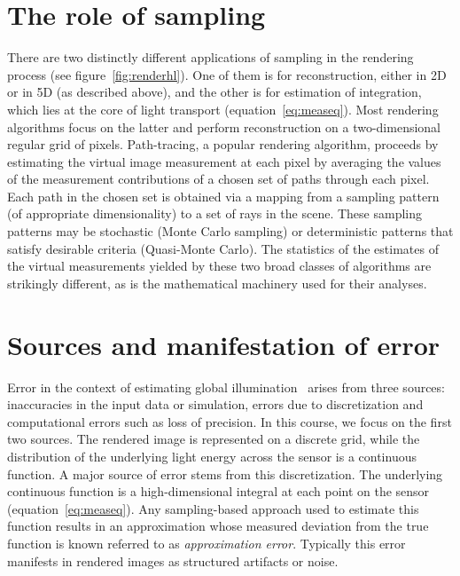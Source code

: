 \documentclass[11pt,fleqn]{book} %
\newcommand{\TBC} {}
\begin{document}
\section{The role of sampling}
There are two distinctly different applications of sampling in the rendering process (see figure~\ref{fig:renderhl}). One of them is for reconstruction, either in 2D or in 5D (as described above), and the other is for estimation of integration, which lies at the core of light transport (equation~\ref{eq:measeq}). Most rendering algorithms focus on the latter and perform reconstruction on a two-dimensional regular grid of pixels. Path-tracing, a popular rendering algorithm, proceeds by estimating the virtual image measurement at each pixel by averaging the values of the measurement contributions of a chosen set of paths through each pixel. Each path in the chosen set is obtained via a mapping from a sampling pattern (of appropriate dimensionality) to a set of rays in the scene. These sampling patterns may be stochastic (Monte Carlo sampling) or deterministic patterns that satisfy desirable criteria (Quasi-Monte Carlo). The statistics of the estimates of the virtual measurements yielded by these two broad classes of algorithms are strikingly different, as is the mathematical machinery used for their analyses.  

\TBC

\section{Sources and manifestation of error}
Error in the context of estimating global illumination~\cite{arvo1994framework} arises from three sources: inaccuracies in the  input data or simulation, errors due to discretization and computational errors such as loss of precision. In this course, we focus on the first two sources. The rendered image is represented on a discrete grid, while the distribution of the underlying light energy across the sensor is a continuous function. A major source of error stems from this discretization. The underlying continuous function is a high-dimensional integral at each point on the sensor (equation~\ref{eq:measeq}). Any sampling-based approach used to estimate this function results in an approximation whose measured deviation from the true function is known referred to as \textit{approximation error}. Typically this error manifests in rendered images as structured artifacts or noise. 
\end{document}
